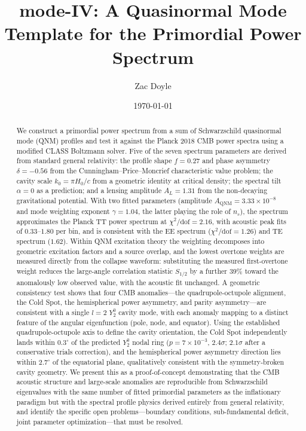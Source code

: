 \documentclass[aps,prd,twocolumn,superscriptaddress,showpacs,preprintnumbers,amsmath,amssymb,nofootinbib]{revtex4-2}
\begin{document}

\title{mode-IV: A Quasinormal Mode Template for the Primordial Power Spectrum}

\author{Zac Doyle}

\date{\today}

\begin{abstract}
We construct a primordial power spectrum from a sum of Schwarzschild quasinormal mode (QNM) profiles and test it against the Planck 2018 CMB power spectra using a modified CLASS Boltzmann solver. Five of the seven spectrum parameters are derived from standard general relativity: the profile shape $f = 0.27$ and phase asymmetry $\delta = -0.56$ from the Cunningham--Price--Moncrief characteristic value problem; the cavity scale $k_0 = \pi H_0/c$ from a geometric identity at critical density; the spectral tilt $\alpha = 0$ as a prediction; and a lensing amplitude $A_L = 1.31$ from the non-decaying gravitational potential. With two fitted parameters (amplitude $A_\mathrm{QNM} = 3.33 \times 10^{-8}$ and mode weighting exponent $\gamma = 1.04$, the latter playing the role of $n_s$), the spectrum approximates the Planck TT power spectrum at $\chi^2/\mathrm{dof} = 2.16$, with acoustic peak fits of $0.33$--$1.80$ per bin, and is consistent with the EE spectrum ($\chi^2/\mathrm{dof} = 1.26$) and TE spectrum ($1.62$). Within QNM excitation theory the weighting decomposes into geometric excitation factors and a source overlap, and the lowest overtone weights are measured directly from the collapse waveform: substituting the measured first-overtone weight reduces the large-angle correlation statistic $S_{1/2}$ by a further 39\% toward the anomalously low observed value, with the acoustic fit unchanged. A geometric consistency test shows that four CMB anomalies---the quadrupole-octupole alignment, the Cold Spot, the hemispherical power asymmetry, and parity asymmetry---are consistent with a single $l = 2$ $Y_2^0$ cavity mode, with each anomaly mapping to a distinct feature of the angular eigenfunction (pole, node, and equator). Using the established quadrupole-octupole axis to define the cavity orientation, the Cold Spot independently lands within $0.3^{\circ}$ of the predicted $Y_2^0$ nodal ring ($p = 7 \times 10^{-3}$, $2.4\sigma$; $2.1\sigma$ after a conservative trials correction), and the hemispherical power asymmetry direction lies within $2.7^{\circ}$ of the equatorial plane, qualitatively consistent with the symmetry-broken cavity geometry. We present this as a proof-of-concept demonstrating that the CMB acoustic structure and large-scale anomalies are reproducible from Schwarzschild eigenvalues with the same number of fitted primordial parameters as the inflationary paradigm but with the spectral profile physics derived entirely from general relativity, and identify the specific open problems---boundary conditions, sub-fundamental deficit, joint parameter optimization---that must be resolved.
\end{abstract}
\end{document}
